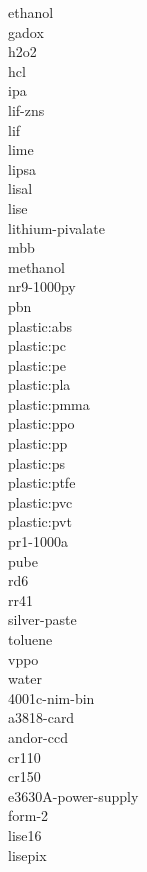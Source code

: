 \documentclass[../main.tex]{subfiles}%
\begin{document}
\gls{ethanol}\\%
\gls{gadox}\\%
\gls{h2o2}\\%
\gls{hcl}\\%
\gls{ipa}\\%
\gls{lif-zns}\\%
\gls{lif}\\%
\gls{lime}\\%
\gls{lipsa}\\%
\gls{lisal}\\%
\gls{lise}\\%
\gls{lithium-pivalate}\\%
\gls{mbb}\\%
\gls{methanol}\\%
\gls{nr9-1000py}\\%
\gls{pbn}\\%
\gls{plastic:abs}\\%
\gls{plastic:pc}\\%
\gls{plastic:pe}\\%
\gls{plastic:pla}\\%
\gls{plastic:pmma}\\%
\gls{plastic:ppo}\\%
\gls{plastic:pp}\\%
\gls{plastic:ps}\\%
\gls{plastic:ptfe}\\%
\gls{plastic:pvc}\\%
\gls{plastic:pvt}\\%
\gls{pr1-1000a}\\%
\gls{pube}\\%
\gls{rd6}\\%
\gls{rr41}\\%
\gls{silver-paste}\\%
\gls{toluene}\\%
\gls{vppo}\\%
\gls{water}\\%
\gls{4001c-nim-bin}\\%
\gls{a3818-card}\\%
\gls{andor-ccd}\\%
\gls{cr110}\\%
\gls{cr150}\\%
\gls{e3630A-power-supply}\\%
\gls{form-2}\\%
\gls{lise16}\\%
\gls{lisepix}\\%
\end{document}
